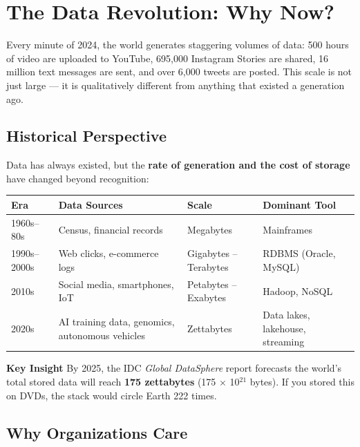 \documentclass[12pt,a4paper]{article}
\newcommand{\insightbox}[1]{%
  \noindent
  \colorbox{PUGold!18}{%
    \begin{minipage}{\dimexpr\linewidth-2\fboxsep}
      \vspace{4pt}
      \textcolor{PUGold!70!black}{\textbf{Key Insight}} \quad #1
      \vspace{4pt}
    \end{minipage}%
  }\par\vspace{6pt}%
}
\begin{document}
\vspace{8pt}

\section{The Data Revolution: Why Now?}

Every minute of 2024, the world generates staggering volumes of data: 500 hours of video are uploaded to YouTube, 695{,}000 Instagram Stories are shared, 16 million text messages are sent, and over 6{,}000 tweets are posted. This scale is not just large — it is qualitatively different from anything that existed a generation ago.

\subsection{Historical Perspective}

Data has always existed, but the \textbf{rate of generation and the cost of storage} have changed beyond recognition:

\begin{center}
\renewcommand{\arraystretch}{1.4}
\begin{tabular}{p{2.0cm}p{4.2cm}p{4.2cm}p{2.8cm}}
  \toprule
  \textbf{Era} & \textbf{Data Sources} & \textbf{Scale} & \textbf{Dominant Tool} \\
  \midrule
  1960s--80s & Census, financial records & Megabytes & Mainframes \\
  1990s--2000s & Web clicks, e-commerce logs & Gigabytes -- Terabytes & RDBMS (Oracle, MySQL) \\
  2010s & Social media, smartphones, IoT & Petabytes -- Exabytes & Hadoop, NoSQL \\
  2020s & AI training data, genomics, autonomous vehicles & Zettabytes & Data lakes, lakehouse, streaming \\
  \bottomrule
\end{tabular}
\end{center}

\insightbox{By 2025, the IDC \textit{Global DataSphere} report forecasts the world's total stored data will reach \textbf{175 zettabytes} (175 $\times$ 10$^{21}$ bytes). If you stored this on DVDs, the stack would circle Earth 222 times.}

\subsection{Why Organizations Care}
\end{document}
